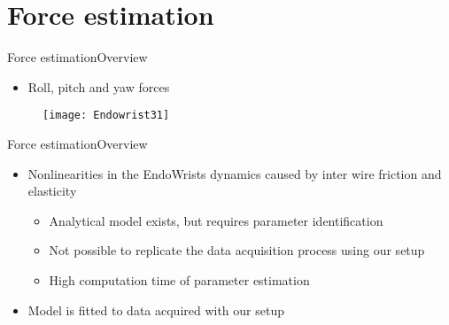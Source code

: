 \section{Force estimation}

\begin{frame}{Force estimation}{Overview}
\begin{itemize}
  	\item Roll, pitch and yaw forces
\end{itemize}
 \begin{figure}[h]
 \centering
 \texttt{[image: Endowrist31]}
 \label{fig:ewr}
 \end{figure}
\end{frame}

\begin{frame}{Force estimation}{Overview}
\begin{itemize}
\item Nonlinearities in the EndoWrists dynamics caused by inter wire friction and elasticity
\begin{itemize}
\item Analytical model exists, but requires parameter identification
\item Not possible to replicate the data acquisition process using our setup
\item High computation time of parameter estimation
\end{itemize}
\item Model is fitted to data acquired with our setup
\end{itemize}
\end{frame}

